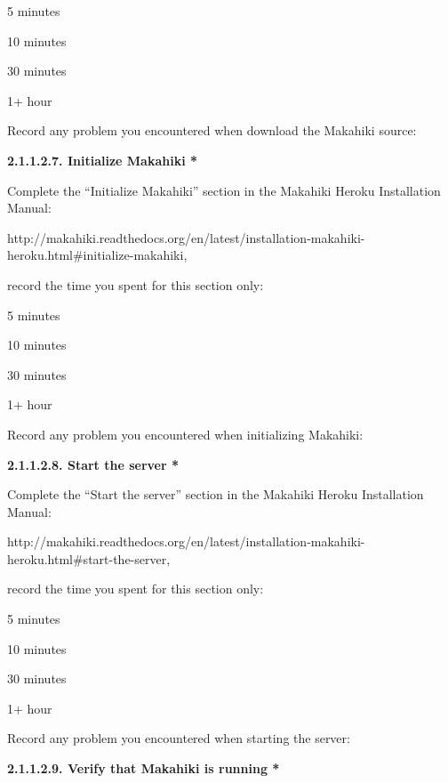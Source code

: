 \begin{radiobutton}
\item 5 minutes
\item  10 minutes
\item  30 minutes
\item  1+ hour
\end{radiobutton}

Record any problem you encountered when download the Makahiki source: \underline{\hspace{3cm}}

{\bf 2.1.1.2.7. Initialize Makahiki *}

Complete the ``Initialize Makahiki'' section in the Makahiki Heroku Installation Manual:

http://makahiki.readthedocs.org/en/latest/installation-makahiki-heroku.html\#initialize-makahiki, 

record the time you spent for this section only:

\begin{radiobutton}
\item 5 minutes
\item  10 minutes
\item  30 minutes
\item  1+ hour
\end{radiobutton}

Record any problem you encountered when initializing Makahiki: \underline{\hspace{4cm}}

{\bf 2.1.1.2.8. Start the server *}

Complete the ``Start the server'' section in the Makahiki Heroku Installation Manual:

http://makahiki.readthedocs.org/en/latest/installation-makahiki-heroku.html\#start-the-server, 

record the time you spent for this section only:

\begin{radiobutton}
\item 5 minutes
\item  10 minutes
\item  30 minutes
\item  1+ hour
\end{radiobutton}

Record any problem you encountered when starting the server: \underline{\hspace{4cm}}

{\bf 2.1.1.2.9. Verify that Makahiki is running *}

